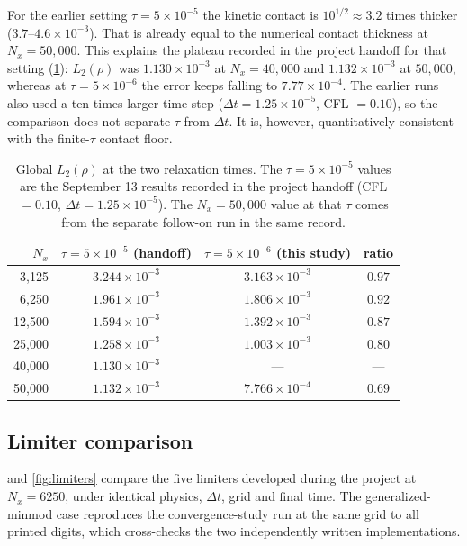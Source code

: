 For the earlier setting $\tau = 5\times10^{-5}$ the kinetic contact is
$10^{1/2}\approx3.2$ times thicker ($3.7$--$4.6\times10^{-3}$).  That is already equal
to the numerical contact thickness at $N_x = 50{,}000$.  This explains the plateau
recorded in the project handoff for that setting (\cref{tab:tau_compare}):
$L_2(\rho)$ was $1.130\times10^{-3}$ at $N_x=40{,}000$ and $1.132\times10^{-3}$ at
$50{,}000$, whereas at $\tau=5\times10^{-6}$ the error keeps falling to
$7.77\times10^{-4}$.  The earlier runs also used a ten times larger time step
($\Delta t = 1.25\times10^{-5}$, CFL $=0.10$), so the comparison does not separate
$\tau$ from $\Delta t$.  It is, however, quantitatively consistent with the
finite-$\tau$ contact floor.

\begin{table}[ht]
\centering
\caption{Global $L_2(\rho)$ at the two relaxation times.  The $\tau=5\times10^{-5}$ values
are the September 13 results recorded in the project handoff (CFL $=0.10$,
$\Delta t=1.25\times10^{-5}$).  The $N_x=50{,}000$ value at that $\tau$ comes from the
separate follow-on run in the same record.}
\label{tab:tau_compare}
\small
\begin{tabular}{@{}rccc@{}}
\toprule
$N_x$ & $\tau=5\times10^{-5}$ (handoff) & $\tau=5\times10^{-6}$ (this study) & ratio \\
\midrule
3,125  & $3.244\times10^{-3}$ & $3.163\times10^{-3}$ & $0.97$ \\
6,250  & $1.961\times10^{-3}$ & $1.806\times10^{-3}$ & $0.92$ \\
12,500 & $1.594\times10^{-3}$ & $1.392\times10^{-3}$ & $0.87$ \\
25,000 & $1.258\times10^{-3}$ & $1.003\times10^{-3}$ & $0.80$ \\
40,000 & $1.130\times10^{-3}$ & --- & --- \\
50,000 & $1.132\times10^{-3}$ & $7.766\times10^{-4}$ & $0.69$ \\
\bottomrule
\end{tabular}
\end{table}

\subsection{Limiter comparison}
\label{sec:limiter_results}

 and \cref{fig:limiters} compare the five limiters developed
during the project at $N_x=6250$, under identical physics, $\Delta t$, grid and final
time.  The generalized-minmod case reproduces the convergence-study run at the same
grid to all printed digits, which cross-checks the two independently written
implementations.

